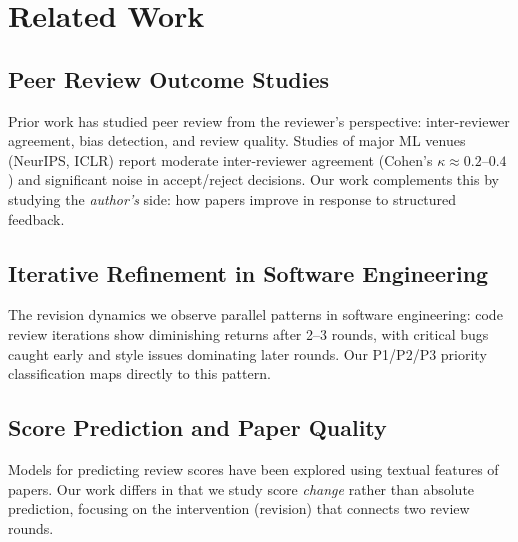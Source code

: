 \section{Related Work}

\subsection{Peer Review Outcome Studies}

Prior work has studied peer review from the reviewer's perspective: inter-reviewer agreement, bias detection, and review quality. Studies of major ML venues (NeurIPS, ICLR) report moderate inter-reviewer agreement (Cohen's $\kappa \approx 0.2$--$0.4$) and significant noise in accept/reject decisions. Our work complements this by studying the \emph{author's} side: how papers improve in response to structured feedback.

\subsection{Iterative Refinement in Software Engineering}

The revision dynamics we observe parallel patterns in software engineering: code review iterations show diminishing returns after 2--3 rounds, with critical bugs caught early and style issues dominating later rounds. Our P1/P2/P3 priority classification maps directly to this pattern.

\subsection{Score Prediction and Paper Quality}

Models for predicting review scores have been explored using textual features of papers. Our work differs in that we study score \emph{change} rather than absolute prediction, focusing on the intervention (revision) that connects two review rounds.
